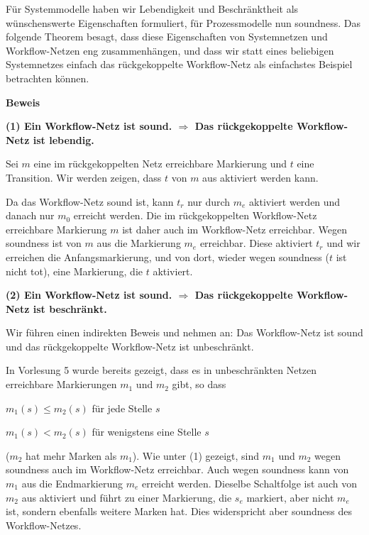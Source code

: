 Für Systemmodelle haben wir Lebendigkeit und Beschränktheit als wünschenswerte Eigenschaften formuliert, für Prozessmodelle nun soundness. Das folgende Theorem besagt, dass diese Eigenschaften von Systemnetzen und Workflow-Netzen eng zusammenhängen, und dass wir statt eines beliebigen Systemnetzes einfach das rückgekoppelte Workflow-Netz als einfachstes Beispiel betrachten können.


\pagebreak %

\textbf{Beweis}

\textbf{(1) Ein Workflow-Netz ist sound. $\Rightarrow$ Das rückgekoppelte Workflow-Netz ist lebendig.}

Sei $m$ eine im rückgekoppelten Netz erreichbare Markierung und $t$ eine Transition. Wir werden zeigen, dass $t$ von $m$ aus aktiviert werden kann.

Da das Workflow-Netz sound ist, kann $t_r$ nur durch $m_e$ aktiviert werden und danach nur $m_0$ erreicht werden. Die im rückgekoppelten Workflow-Netz erreichbare Markierung $m$ ist daher auch im Workflow-Netz erreichbar. Wegen soundness ist von $m$ aus die Markierung $m_e$ erreichbar. Diese aktiviert $t_r$ und wir erreichen die Anfangsmarkierung, und von dort, wieder wegen soundness ($t$ ist nicht tot), eine Markierung, die $t$ aktiviert.

\vspace{\baselineskip}

\textbf{(2) Ein Workflow-Netz ist sound. $\Rightarrow$ Das rückgekoppelte Workflow-Netz ist beschränkt.}

Wir führen einen indirekten Beweis und nehmen an: Das Workflow-Netz ist sound und das rückgekoppelte Workflow-Netz ist unbeschränkt.

In Vorlesung 5 wurde bereits gezeigt, dass es in unbeschränkten Netzen erreichbare Markierungen $m_1$ und $m_2$ gibt, so dass 
\begin{center}
	$m_1(s) \leq m_2(s)$ für jede Stelle $s$ 
	
	$m_1(s) < m_2(s)$ für wenigstens eine Stelle $s$
\end{center}
($m_2$ hat mehr Marken als $m_1$).
Wie unter (1) gezeigt, sind $m_1$ und $m_2$ wegen sound\-ness auch im Workflow-Netz erreichbar. Auch wegen soundness kann von $m_1$ aus die Endmarkierung $m_e$ erreicht werden. Dieselbe Schaltfolge ist auch von $m_2$ aus aktiviert und führt zu einer Markierung, die $s_e$ markiert, aber nicht $m_e$ ist, sondern ebenfalls weitere Marken hat. Dies widerspricht aber soundness des Workflow-Netzes.


